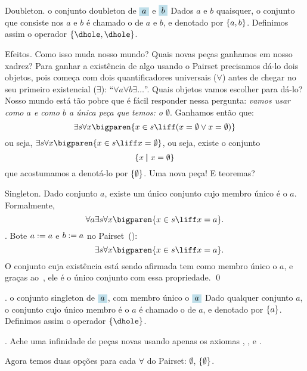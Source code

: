  Doubleton.
%
 {o conjunto doubleton de $\holed a$ e $\holed b$}%
Dados $a$ e $b$ quaisquer, o conjunto que consiste nos $a$ e $b$
é chamado o  de $a$ e $b$, e denotado por $\left\{a, b\right\}$.
Definimos assim o operador $\set{\dhole, \dhole}$.

\note Efeitos.
Como isso muda nosso mundo?
Quais novas peças ganhamos em nosso xadrez?
Para ganhar a existência de algo usando o Pairset
precisamos dá-lo dois objetos,
pois começa com dois quantificadores universais ($\forall$) antes de chegar no seu primeiro existencial ($\exists$):
``$\forall a\forall b \exists \dots$''.
Quais objetos vamos escolher para dá-lo?
Nosso mundo está tão pobre que é fácil responder nessa pergunta:
\emph{vamos usar como $a$ e como $b$ a única peça que temos: o $\emptyset$}.
Ganhamos então que:
$$
\exists s \forall x\bigparen { x \in s \liff \paren{ x = \emptyset \lor x = \emptyset }}
$$
ou seja, $\exists s \forall x \bigparen { x \in s \liff x = \emptyset }$,
ou seja, existe o conjunto
$$
\left\{ x \;\mathord{\pmb{\mid}}\; x = \emptyset \right\}
$$
que acostumamos a denotá-lo por $\left\{\emptyset\right\}$.
Uma nova peça!  E teoremas?

\theorem Singleton.
\label{singleton_thm}%
Dado conjunto $a$, existe um único conjunto cujo membro único é o $a$.
Formalmente,
$$
\forall a
\exists s
\forall x
\bigparen{
x\in s
\liff
x = a
}.
$$
\proof.
Bote $a\mathrel{:=} a$ e $b\mathrel{:=} a$ no Pairset~():
$$
\phantom{\forall a}
\exists s
\forall x
\bigparen{
x \in s
\liff
x = a
}.
$$
O conjunto cuja existência está sendo afirmada tem como membro único o $a$,
e graças ao~, ele é o único conjunto com essa propriedade.
\qed

.
\label{singleton}%
 {o conjunto singleton de $\holed a$, com membro único o $\holed a$}%
Dado qualquer conjunto $a$, o conjunto cujo único membro é o $a$
é chamado o  de $a$, e denotado por $\left\{a\right\}$.
Definimos assim o operador $\set{\dhole}$.

\exercise.
Ache uma infinidade de peças novas usando apenas os axiomas , , e .

\hint
Agora temos duas opções para cada $\forall$ do Pairset: $\emptyset$, $\left\{\emptyset\right\}$.

\endexercise

